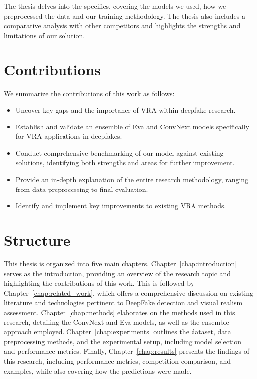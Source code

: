 \documentclass[a4paper,12pt,openright]{book}
\begin{document}
The thesis delves into the specifics, covering the models we used, how we preprocessed the data and our training methodology. The thesis also includes a comparative analysis with other competitors and highlights the strengths and limitations of our solution.

\section{Contributions}

We summarize the contributions of this work as follows:

\begin{itemize}
    \item Uncover key gaps and the importance of VRA within deepfake research.
    \item Establish and validate an ensemble of Eva and ConvNext models specifically for VRA applications in deepfakes.
    \item Conduct comprehensive benchmarking of our model against existing solutions, identifying both strengths and areas for further improvement.
    \item Provide an in-depth explanation of the entire research methodology, ranging from data preprocessing to final evaluation.
    \item Identify and implement key improvements to existing VRA methods.
\end{itemize}


\section{Structure}

This thesis is organized into five main chapters. Chapter~\ref{chap:introduction} serves as the introduction, providing an overview of the research topic and highlighting the contributions of this work. This is followed by Chapter~\ref{chap:related_work}, which offers a comprehensive discussion on existing literature and technologies pertinent to DeepFake detection and visual realism assessment. Chapter~\ref{chap:methods} elaborates on the methods used in this research, detailing the ConvNext and Eva models, as well as the ensemble approach employed. Chapter~\ref{chap:experiments} outlines the dataset, data preprocessing methods, and the experimental setup, including model selection and performance metrics. Finally, Chapter~\ref{chap:results} presents the findings of this research, including performance metrics, competition comparison, and examples, while also covering how the predictions were made.
\end{document}
